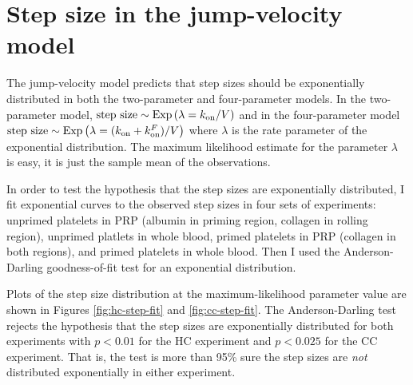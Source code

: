 \documentclass{article}
\newcommand{\tn}{\textnormal}
\DeclareMathOperator{\Exp}{Exp}
\begin{document}
\newpage

\section{Step size in the jump-velocity model}
\label{sec:step-size-jump}

The jump-velocity model predicts that step sizes should be
exponentially distributed in both the two-parameter and four-parameter
models. In the two-parameter model, $\tn{step size} \sim
\Exp\left(\lambda = k_\tn{on}/V\right)$ and in the four-parameter
model $\tn{step size} \sim \Exp\left(\lambda = (k_\tn{on} +
  k_\tn{on}^F)/V \right)$ where $\lambda$ is the rate parameter of the
exponential distribution. The maximum likelihood estimate for the
parameter $\lambda$ is easy, it is just the sample mean of the
observations.

In order to test the hypothesis that the step sizes are exponentially
distributed, I fit exponential curves to the observed step sizes in
four sets of experiments: unprimed platelets in PRP (albumin in
priming region, collagen in rolling region), unprimed platlets in
whole blood, primed platelets in PRP (collagen in both regions), and
primed platelets in whole blood. Then I used the Anderson-Darling
goodness-of-fit test for an exponential distribution.

Plots of the step size distribution at the maximum-likelihood
parameter value are shown in Figures \ref{fig:hc-step-fit} and
\ref{fig:cc-step-fit}. The Anderson-Darling test rejects the
hypothesis that the step sizes are exponentially distributed for both
experiments with $p < 0.01$ for the HC experiment and $p < 0.025$ for
the CC experiment. That is, the test is more than 95\% sure the step
sizes are \emph{not} distributed exponentially in either experiment.
\end{document}
